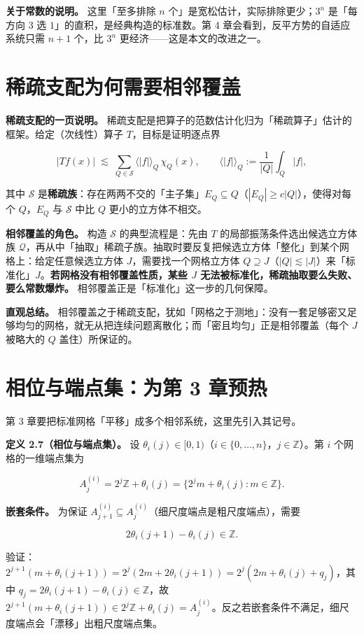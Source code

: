 \documentclass[a4paper,11pt,openany]{ctexbook}
\numberwithin{equation}{chapter}
\numberwithin{figure}{chapter}
\numberwithin{table}{chapter}
\begin{document}
\textbf{关于常数的说明。} 这里「至多排除 $n$ 个」是宽松估计，实际排除更少；$3^n$ 是「每方向 $3$ 选 $1$」的直积，是经典构造的标准数。第 4 章会看到，反平方势的自适应系统只需 $n+1$ 个，比 $3^n$ 更经济——这是本文的改进之一。

\section{稀疏支配为何需要相邻覆盖}

\textbf{稀疏支配的一页说明。} 稀疏支配是把算子的范数估计化归为「稀疏算子」估计的框架。给定（次线性）算子 $T$，目标是证明逐点界

$$|Tf(x)|\;\lesssim\; \sum_{Q\in\mathcal S}\langle |f|\rangle_Q\,\chi_Q(x),\qquad \langle |f|\rangle_Q:=\frac1{|Q|}\int_Q|f|,$$

其中 $\mathcal S$ 是\textbf{稀疏族}：存在两两不交的「主子集」$E_Q\subseteq Q$（$|E_Q|\ge c|Q|$），使得对每个 $Q$，$E_Q$ 与 $\mathcal S$ 中比 $Q$ 更小的立方体不相交。

\textbf{相邻覆盖的角色。} 构造 $\mathcal S$ 的典型流程是：先由 $T$ 的局部振荡条件选出候选立方体族 $\mathcal Q$，再从中「抽取」稀疏子族。抽取时要反复把候选立方体「整化」到某个网格上：给定任意候选立方体 $J$，需要找一个网格立方体 $Q\supseteq J$（$|Q|\lesssim|J|$）来「标准化」$J$。\textbf{若网格没有相邻覆盖性质，某些 $J$ 无法被标准化，稀疏抽取要么失败、要么常数爆炸。} 相邻覆盖正是「标准化」这一步的几何保障。

\textbf{直观总结。} 相邻覆盖之于稀疏支配，犹如「网格之于测地」：没有一套足够密又足够均匀的网格，就无从把连续问题离散化；而「密且均匀」正是相邻覆盖（每个 $J$ 被略大的 $Q$ 盖住）所保证的。

\section{相位与端点集：为第 3 章预热}

第 3 章要把标准网格「平移」成多个相邻系统，这里先引入其记号。

\textbf{定义 2.7（相位与端点集）。} 设 $\theta_i(j)\in[0,1)$（$i\in\{0,\dots,n\}$，$j\in\mathbb Z$）。第 $i$ 个网格的一维端点集为

$$A_j^{(i)}=2^j\mathbb Z+\theta_i(j)=\{2^j m+\theta_i(j):m\in\mathbb Z\}.$$

\textbf{嵌套条件。} 为保证 $A_{j+1}^{(i)}\subseteq A_j^{(i)}$（细尺度端点是粗尺度端点），需要

$$2\theta_i(j+1)-\theta_i(j)\in\mathbb Z.$$

验证：$2^{j+1}(m+\theta_i(j+1))=2^j(2m+2\theta_i(j+1))=2^j(2m+\theta_i(j)+q_j)$，其中 $q_j=2\theta_i(j+1)-\theta_i(j)\in\mathbb Z$，故 $2^{j+1}(m+\theta_i(j+1))\in 2^j\mathbb Z+\theta_i(j)=A_j^{(i)}$。反之若嵌套条件不满足，细尺度端点会「漂移」出粗尺度端点集。
\end{document}
